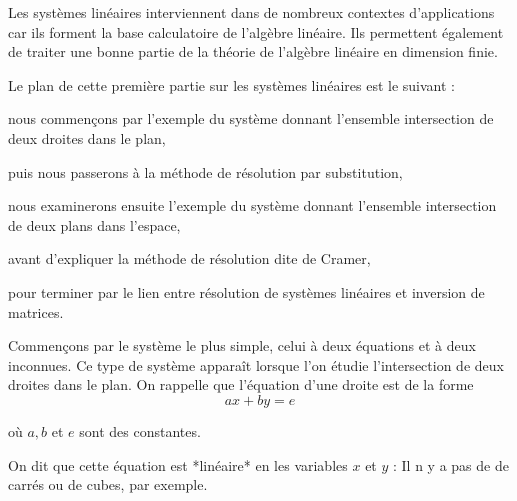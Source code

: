 







\debuttexte


\diapo

Les systèmes linéaires interviennent dans de nombreux contextes 
d'applications car ils forment la base calculatoire 
de l'algèbre linéaire. Ils permettent également de traiter 
une bonne partie de la théorie de l'algèbre linéaire en dimension finie.

\change

Le plan de cette première partie sur les systèmes linéaires est le suivant :

\change

nous commençons par l'exemple du système donnant l'ensemble intersection de  deux droites dans le plan,

\change

puis nous passerons à la méthode de résolution par substitution,

\change

nous examinerons ensuite l'exemple du système donnant l'ensemble intersection de deux plans dans l'espace,

\change

avant d'expliquer la méthode de résolution dite de Cramer,

\change

pour terminer par le lien entre résolution de systèmes linéaires et inversion de matrices. 





\diapo

Commençons par le système le plus simple, celui à deux équations et à deux inconnues. Ce type de système apparaît lorsque l'on étudie l'intersection de deux droites dans le plan. On rappelle que l'équation d'une droite est de la forme
$$a x + b y = e$$

où $a, b$ et $e$ sont des constantes.

\change

On dit que cette équation est *linéaire* en les variables \(x\) et \(y\) : 
Il n y a pas de de carrés ou de cubes, par exemple.

\change

